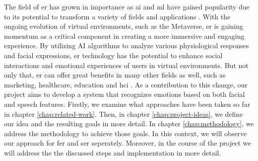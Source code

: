  \noindent The field of \acrfull{er} has grown in importance as \acrfull{ai} and \acrfull{ml} have gained popularity due to its potential to transform a variety of fields and applications \cite{er-appl}. With the ongoing evolution of virtual environments, such as the Metaverse, \acrshort{er} is gaining momentum as a critical component in creating a more immersive and engaging experience. By utilizing AI algorithms to analyze various physiological responses and facial expressions, \acrshort{er} technology has the potential to enhance social interactions and emotional experiences of users in virtual environments. But not only that, \acrshort{er} can offer great benefits in many other fields as well, such as marketing, healthcare, education and \acrfull{hci} \cite{er-appl,healthcare,EGGER201935}. As a contribution to this change, our project aims to develop a system that recognizes emotions based on both facial and speech features. Firstly, we examine what approaches have been taken so far in chapter \ref{chap:related-work}. Then, in chapter \ref{chap:project-ideas}, we define our idea and the resulting goals in more detail. In chapter \ref{chap:methodology}, we address the methodology to achieve those goals. In this context, we will observe our approach for \acrfull{fer} and \acrfull{ser} seperately. Moreover, in the course of the project we will address the the discussed steps and implementation in more detail.
